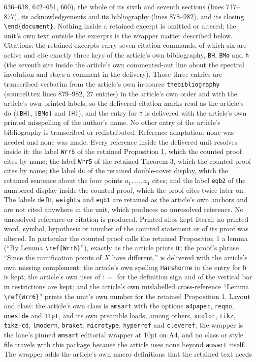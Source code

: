 \documentclass[10pt,a4paper]{amsart}
\theoremstyle{plain}
\theoremstyle{definition}
\theoremstyle{remark}
\newcommand{\ce}{\mathrel{\mathop:}=}
\begin{document}
636--638, 642--651, 660), the whole of its sixth and seventh sections (lines 717--877), its acknowledgements and its bibliography (lines 878--982), and its closing \texttt{\textbackslash end\{document\}}. Nothing inside a retained excerpt is omitted or altered; the unit's own text outside the excerpts is the wrapper matter described below. Citations: the retained excerpts carry seven citation commands, of which six are active and cite exactly three keys of the article's own bibliography, \texttt{BH}, \texttt{BMo} and \texttt{h} (the seventh sits inside the article's own commented-out line about the spectral involution and stays a comment in the delivery). Those three entries are transcribed verbatim from the article's own in-source \texttt{thebibliography} (source0.tex lines 879--982, 27 entries) in the article's own order and with the article's own printed labels, so the delivered citation marks read as the article's do (\texttt{[BH]}, \texttt{[BMo]} and \texttt{[H]}), and the entry for \texttt{h} is delivered with the article's own printed misspelling of the author's name. No other entry of the article's bibliography is transcribed or redistributed. Reference adaptation: none was needed and none was made. Every reference inside the delivered unit resolves inside it: the label \texttt{Wrr6} of the retained Proposition 1, which the counted proof cites by name; the label \texttt{Wrr5} of the retained Theorem 3, which the counted proof cites by name; the label \texttt{dc} of the retained double-cover display, which the retained sentence about the four points $a_1,\dots,a_4$ cites; and the label \texttt{eqb2} of the numbered display inside the counted proof, which the proof cites twice later on. The labels \texttt{defH}, \texttt{weights} and \texttt{eqb1} are retained as the article's own anchors and are not cited anywhere in the unit, which produces no unresolved reference. No unresolved reference or citation is produced. Printed slips kept literal: no printed word, symbol, hypothesis or number of the counted statement or of its proof was altered. In particular the counted proof calls the retained Proposition 1 a lemma (``By Lemma \texttt{\textbackslash ref\{Wrr6\}}''), exactly as the article prints it; the proof's phrase ``Since the ramification points of $X$ have different,'' is delivered with the article's own missing complement; the article's own spelling \texttt{Harshorne} in the entry for \texttt{h} is kept; the article's own uses of $\ce$ for the definition sign and of the vertical bar in restrictions are kept; and the article's own mislabelled cross-reference ``Lemma \texttt{\textbackslash ref\{Wrr6\}}'' prints the unit's own number for the retained Proposition 1. Layout and class: the article's own class is \texttt{amsart} with the options \texttt{a4paper}, \texttt{reqno}, \texttt{oneside} and \texttt{11pt}, and its own preamble loads, among others, \texttt{xcolor}, \texttt{tikz}, \texttt{tikz-cd}, \texttt{lmodern}, \texttt{braket}, \texttt{microtype}, \texttt{hyperref} and \texttt{cleveref}; the wrapper is the lane's pinned \texttt{amsart} editorial wrapper at 10pt on A4, and no class or style file travels with this package because the article uses none beyond \texttt{amsart} itself. The wrapper adds the article's own macro definitions that the retained text needs 
\end{document}
